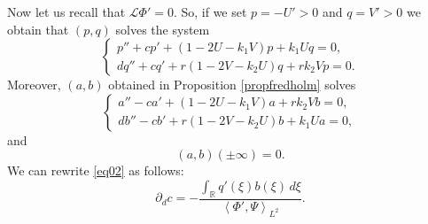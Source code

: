 \documentclass[11pt]{article}
\numberwithin{equation}{section}
\newcommand{\1}{\mathbbm{1}}
\numberwithin{equation}{section}
\theoremstyle{definition}
\def \dis {\displaystyle}
\def \R {\mathbb{R}}
\def \L {\mathcal{L}}
\numberwithin{equation}{section}
\def \dis {\displaystyle}
\begin{document}
Now let us recall that $\L \Phi'=0$. So, if we set $p=-U'>0$ and $q=V'>0$ we obtain that $(p,q)$ solves the system
\begin{equation}\label{syst2new}
	\left\{ 
	\begin{array}{llllll}
		p''+cp'+(1-2U-k_1V)p+k_1Uq=0,\\
		dq''+cq'+r(1-2V-k_2U)q+rk_2Vp=0.
	\end{array} 
	\right.
\end{equation}
Moreover, $(a,b)$ obtained in Proposition \ref{propfredholm} solves
\begin{equation}\label{systab}
	\left\{ 
	\begin{array}{llllll}
		a''-ca'+(1-2U-k_1V)a+rk_2Vb=0,\\
		db''-cb'+r(1-2V-k_2U)b+k_1Ua=0,
	\end{array} 
	\right.
\end{equation}
and 
\begin{equation}\label{limab}
(a,b)(\pm \infty)=0.
\end{equation}
We can rewrite \eqref{eq02} as follows:
\begin{equation}\label{eq03}
	\dis 	\partial_dc =-\frac{\dis \int_{\R}q'(\xi)b(\xi)\,d\xi}{\left \langle \Phi', \Psi\right\rangle_{L^2}}.
\end{equation}
\end{document}
